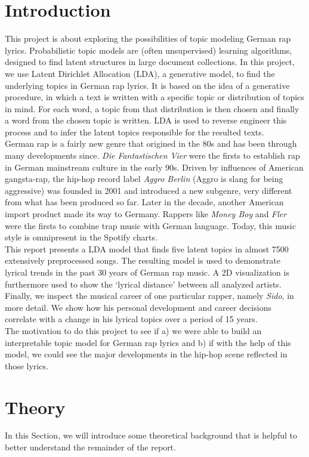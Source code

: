 \documentclass[conference]{IEEEtran}
\begin{document}
\section{Introduction}
This project is about exploring the possibilities of topic modeling German rap lyrics. Probabilistic topic models are (often unsupervised) learning algorithms, designed to find latent structures in large document collections. In this project, we use Latent Dirichlet Allocation (LDA), a generative model, to find the underlying topics in German rap lyrics. It is based on the idea of a generative procedure, in which a text is written with a specific topic or distribution of topics in mind. For each word, a topic from that distribution is then chosen and finally a word from the chosen topic is written. LDA is used to reverse engineer this process and to infer the latent topics responsible for the resulted texts.\\
German rap is a fairly new genre that origined in the 80s and has been through many developments since. \textit{Die Fantastischen Vier} were the firsts to establish rap in German mainstream culture in the early 90s. Driven by influences of American gangsta-rap, the hip-hop record label \textit{Aggro Berlin} (Aggro is slang for being aggressive) was founded in 2001 and introduced a new subgenre, very different from what has been produced so far. Later in the decade, another American import product made its way to Germany. Rappers like \textit{Money Boy} and \textit{Fler} were the firsts to combine trap music with German language. Today, this music style is omnipresent in the Spotify charts.\\
This report presents a LDA model that finds five latent topics in almost 7500 extensively preprocessed songs. The resulting model is used to demonstrate lyrical trends in the past 30 years of German rap music. A 2D visualization is furthermore used to show the {\lq}lyrical distance{\rq} between all analyzed artists. Finally, we inspect the musical career of one particular rapper, namely \textit{Sido}, in more detail. We show how his personal development and career decisions correlate with a change in his lyrical topics over a period of 15 years.\\
The motivation to do this project to see if a) we were able to build an interpretable topic model for German rap lyrics and b) if with the help of this model, we could see the major developments in the hip-hop scene reflected in those lyrics.

\section{Theory}
In this Section, we will introduce some theoretical background that is helpful to better understand the remainder of the report.
\end{document}
